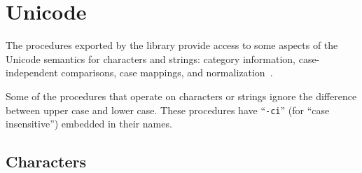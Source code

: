 \chapter{Unicode}
\label{unicodechapter}

\newcommand{\latingreek}[1]{\texonly\mathit{#1}\endtexonly\htmlonly\textit{#1}\endhtmlonly}

The procedures exported by the 
library provide access to some aspects
of the Unicode semantics for characters and strings:
category information, case-independent comparisons,
case mappings, and normalization~\cite{Unicode}.

Some of the procedures that operate on characters or strings ignore the
difference between upper case and lower case.  These procedures
have \hbox{``{\tt -ci}''} (for ``case
insensitive'') embedded in their names.

\section{Characters}

